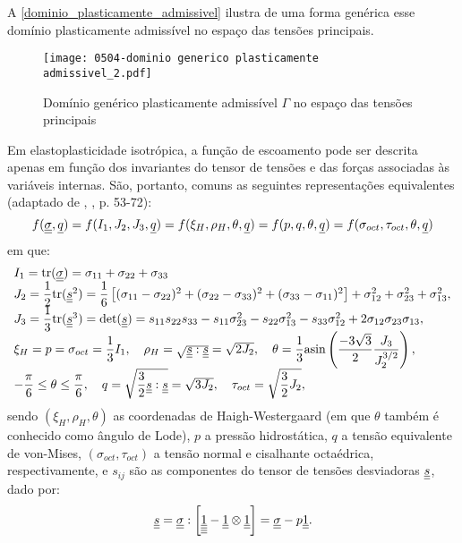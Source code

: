 A \autoref{dominio_plasticamente_admissivel} ilustra de uma forma genérica esse domínio plasticamente admissível no espaço das tensões principais.
\begin{figure}[H]
	\begin{center}
		\texttt{[image: 0504-dominio generico plasticamente admissivel\_2.pdf]}
	\end{center}
	\caption{\label{dominio_plasticamente_admissivel}Domínio genérico plasticamente admissível $\Gamma$ no espaço das tensões principais}
\end{figure}
Em elastoplasticidade isotrópica, a função de escoamento pode ser descrita apenas em função dos invariantes do tensor de tensões e das forças associadas às variáveis internas. São, portanto, comuns as seguintes representações equivalentes (adaptado de \citeauthor{Chen1988}, \citeyear{Chen1988}, p. 53-72):
\begin{equation}
	\label{eq:funcoes_escoamento}
	f(\underline{\underline \sigma},\underline q) = f(I_1,J_2,J_3,\underline q) = f(\xi_{H},\rho_{H},\theta,\underline q) = f(p,q,\theta,\underline q) = f(\sigma_{oct},\tau_{oct},\theta,\underline q)
\end{equation}
em que:
\begin{equation}
	\label{eq:invariantes_tensores}
		\begin{array}{lcl}
			I_1 = \text{tr}(\underline{\underline \sigma}) = \sigma_{11}+\sigma_{22}+\sigma_{33}\\
			J_2 = \dfrac{1}{2}\text{tr}(\underline{\underline s}^2) = \dfrac{1}{6}\left[ (\sigma_{11}-\sigma_{22})^2 + (\sigma_{22}-\sigma_{33})^2 + (\sigma_{33}-\sigma_{11})^2 \right] + \sigma_{12}^2+ \sigma_{23}^2+ \sigma_{13}^2, \\
			J_3 = \dfrac{1}{3}\text{tr}(\underline{\underline s}^3) = \text{det}(\underline{\underline s}) = s_{11}s_{22}s_{33}-s_{11}\sigma_{23}^2-s_{22}\sigma_{13}^2-s_{33}\sigma_{12}^2+2\sigma_{12}\sigma_{23}\sigma_{13}, \\ 
			\xi_{H} = p = \sigma_{oct} = \dfrac{1}{3}I_1, ~~~ \rho_{H} = \sqrt{\underline{\underline s}:\underline{\underline s}} = \sqrt{2J_2}, ~~~ \theta = \dfrac{1}{3}\text{asin}\left( \dfrac{-3\sqrt{3}}{2} \dfrac{J_3}{J_2^{3/2}} \right), \\
			-\dfrac{\pi}{6} \le \theta \le \dfrac{\pi}{6}, ~~~ q = \sqrt{\dfrac{3}{2}\underline{\underline s}:\underline{\underline s}} = \sqrt{3J_2}, ~~~ \tau_{oct} = \sqrt{\dfrac{3}{2}J_2},
	\end{array}
\end{equation}
sendo $(\xi_H,\rho_H,\theta)$ as coordenadas de Haigh-Westergaard (em que $\theta$ também é conhecido como ângulo de Lode), $p$ a pressão hidrostática, $q$ a tensão equivalente de von-Mises, $(\sigma_{oct},\tau_{oct})$ a tensão normal e cisalhante octaédrica, respectivamente, e $s_{ij}$ são as componentes do tensor de tensões desviadoras $\underline{\underline s}$, dado por:
\begin{equation}
	\label{eq:tensor_desviador}
	\underline{\underline s} = \underline{\underline \sigma}: \left[ \underline{\underline{\underline{\underline 1}}}-\underline{\underline 1} \otimes \underline{\underline 1} \right] = \underline{\underline \sigma} - p\underline{\underline 1}.
\end{equation}

